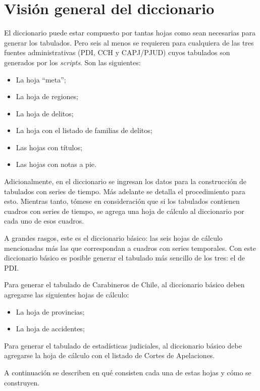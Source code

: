 \documentclass[
  spanish,
]{book}
\begin{document}
\hypertarget{visiuxf3n-general-del-diccionario}{%
\section{Visión general del diccionario}\label{visiuxf3n-general-del-diccionario}}

El diccionario puede estar compuesto por tantas hojas como sean necesarias para generar los tabulados. Pero seis al menos se requieren para cualquiera de las tres fuentes administrativas (PDI, CCH y CAPJ/PJUD) cuyos tabulados son generados por los \emph{scripts}. Son las siguientes:

\begin{itemize}
\item
  La hoja ``meta'';
\item
  La hoja de regiones;
\item
  La hoja de delitos;
\item
  La hoja con el listado de familias de delitos;
\item
  Las hojas con títulos;
\item
  Las hojas con notas a pie.
\end{itemize}

Adicionalmente, en el diccionario se ingresan los datos para la construcción de tabulados con series de tiempo. Más adelante se detalla el procedimiento para esto. Mientras tanto, tómese en consideración que si los tabulados contienen cuadros con series de tiempo, se agrega una hoja de cálculo al diccionario por cada uno de esos cuadros.

A grandes rasgos, este es el diccionario básico: las seis hojas de cálculo mencionadas más las que correspondan a cuadros con series temporales. Con este diccionario básico es posible generar el tabulado más sencillo de los tres: el de PDI.

Para generar el tabulado de Carabineros de Chile, al diccionario básico deben agregarse las siguientes hojas de cálculo:

\begin{itemize}
\item
  La hoja de provincias;
\item
  La hoja de accidentes;
\end{itemize}

Para generar el tabulado de estadísticas judiciales, al diccionario básico debe agregarse la hoja de cálculo con el listado de Cortes de Apelaciones.

A continuación se describen en qué consisten cada una de estas hojas y cómo se construyen.
\end{document}
